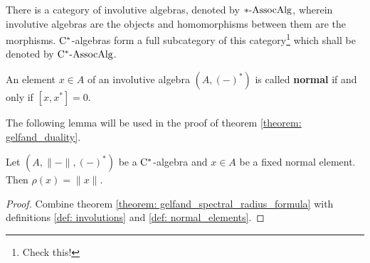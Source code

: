         \begin{convention}
            There is a category of involutive algebras, denoted by $*\text{-}\mathrm{Assoc}\mathrm{Alg}$, wherein involutive algebras are the objects and homomorphisms between them are the morphisms. $\mathrm{C}^*$-algebras form a full subcategory of this category\footnote{Check this!} which shall be denoted by $\mathrm{C}^*\text{-}\mathrm{Assoc}\mathrm{Alg}$. 
        \end{convention}
            
        \begin{definition} \label{def: normal_elements}
            An element $x \in A$ of an involutive algebra $(A, (-)^*)$ is called \textbf{normal} if and only if $[x, x^*] = 0$.
        \end{definition}
        The following lemma will be used in the proof of theorem \ref{theorem: gelfand_duality}.
        \begin{lemma} \label{prop: spectral_radii_and_norms_of_normal_elements}
            Let $(A, \|-\|, (-)^*)$ be a $\mathrm{C}^*$-algebra and $x \in A$ be a fixed normal element. Then $\rho(x) = \|x\|$.
        \end{lemma}
            \begin{proof}
                Combine theorem \ref{theorem: gelfand_spectral_radius_formula} with definitions \ref{def: involutions} and \ref{def: normal_elements}.
            \end{proof}
            
